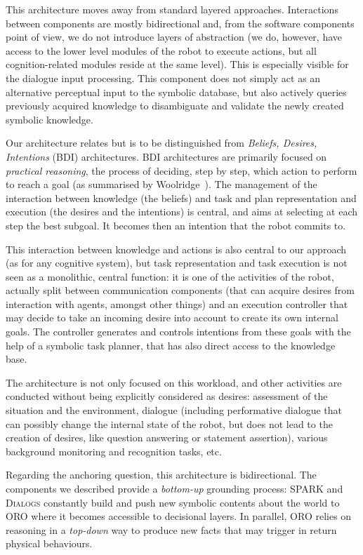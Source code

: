 This architecture moves away from standard layered approaches. Interactions
between components are mostly bidirectional and, from the software components
point of view, we do not introduce layers of abstraction (we do, however, have
access to the lower level modules of the robot to execute actions, but all
cognition-related modules reside at the same level). This is especially visible
for the dialogue input processing. This component does not simply act as an
alternative perceptual input to the symbolic database, but also actively
queries previously acquired knowledge to disambiguate and validate the newly
created symbolic knowledge.

Our architecture relates but is to be distinguished from \emph{Beliefs,
Desires, Intentions} (BDI) architectures. BDI architectures are primarily
focused on \emph{practical reasoning}, \ie the process of deciding, step by
step, which action to perform to reach a goal (as summarised by
Woolridge~\cite{Woolridge1999}). The management of the interaction between
knowledge (the beliefs) and task and plan representation and execution (the
desires and the intentions) is central, and aims at selecting at each step the
best subgoal. It becomes then an intention that the robot commits to.

This interaction between knowledge and actions is also central to our approach
(as for any cognitive system), but task representation and task execution is
not seen as a monolithic, central function: it is one of the activities of the
robot, actually split between communication components (that can acquire
desires from interaction with agents, amongst other things) and an execution
controller that may decide to take an incoming desire into account to create
its own internal goals. The controller generates and controls intentions from
these goals with the help of a symbolic task planner, that has also direct
access to the knowledge base.

The architecture is not only focused on this workload, and other
activities are conducted without being explicitly considered as desires:
assessment of the situation and the environment, dialogue (including
performative dialogue that can possibly change the internal state of the robot,
but does not lead to the creation of desires,  like question answering or
statement assertion), various background monitoring and recognition tasks, etc.

Regarding the anchoring question, this architecture is bidirectional. The
components we described provide a \textit{bottom-up} grounding process: SPARK
and \textsc{Dialogs} constantly build and push new symbolic contents about the
world to ORO where it becomes accessible to decisional layers. In parallel, ORO
relies on reasoning in a \textit{top-down} way to produce new facts that may
trigger in return physical behaviours. 


